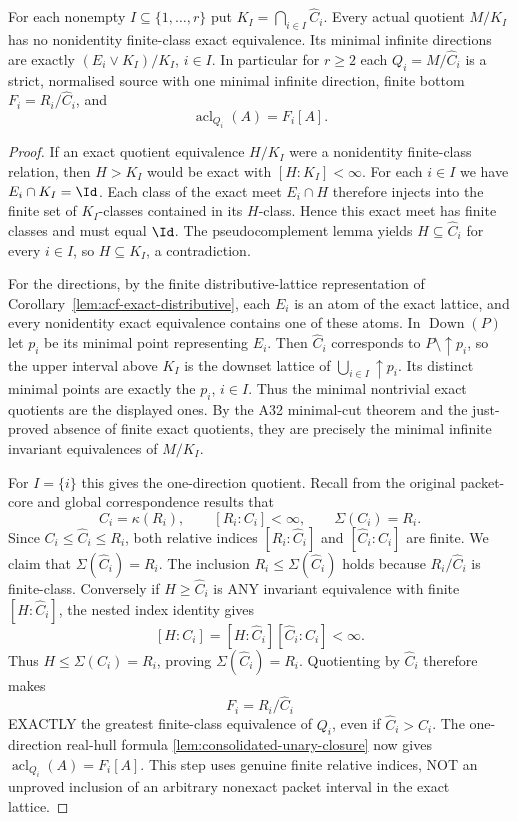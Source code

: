 \begin{lemma}
\label{lem:acf-hat-normalised}
For each nonempty $I\subseteq\{1,\ldots,r\}$ put
$K_I=\bigcap_{i\in I}\widehat C_i$.
Every actual quotient $M/K_I$ has no nonidentity finite-class
exact equivalence.  Its minimal infinite directions are exactly
$(E_i\vee K_I)/K_I$, $i\in I$.
In particular for $r\ge2$ each
$Q_i=M/\widehat C_i$ is a strict, normalised source with
one minimal infinite direction, finite bottom
$F_i=R_i/\widehat C_i$, and
\[
       \operatorname{acl}_{Q_i}(A)=F_i[A].
\]
\end{lemma}
\begin{proof}
If an exact quotient equivalence $H/K_I$ were a nonidentity
finite-class relation, then $H>K_I$ would be exact with
$[H:K_I]<\infty$.  For each $i\in I$ we have
$E_i\cap K_I=\Id$.  Each class of the exact meet
$E_i\cap H$ therefore injects into the finite set of
$K_I$-classes contained in its $H$-class.  Hence this exact
meet has finite classes and must equal $\Id$.
The pseudocomplement lemma yields
$H\subseteq\widehat C_i$ for every $i\in I$, so
$H\subseteq K_I$, a contradiction.

For the directions, by the finite distributive-lattice
representation of Corollary~\ref{lem:acf-exact-distributive},
each $E_i$ is an atom of the exact lattice, and every
nonidentity exact equivalence contains one of these atoms.
In $\operatorname{Down}(P)$ let $p_i$ be its minimal point
representing $E_i$.  Then $\widehat C_i$ corresponds to
$P\setminus\uparrow p_i$, so the upper interval above $K_I$
is the downset lattice of $\bigcup_{i\in I}\uparrow p_i$.
Its distinct minimal points are exactly the $p_i$, $i\in I$.
Thus the minimal nontrivial exact quotients are the displayed
ones.  By the A32 minimal-cut theorem and the just-proved
absence of finite exact quotients, they are precisely the
minimal infinite invariant equivalences of $M/K_I$.

For \(I=\{i\}\) this gives the
one-direction quotient.
Recall from the original packet-core and
global correspondence results that
\[
      C_i=\kappa(R_i),\qquad
      [R_i:C_i]<\infty,\qquad
      \Sigma(C_i)=R_i .
\]
Since
\(C_i\le\widehat C_i\le R_i\),
both relative indices
\([R_i:\widehat C_i]\) and
\([\widehat C_i:C_i]\)
are finite. We claim that
\(\Sigma(\widehat C_i)=R_i\).
The inclusion \(R_i\le\Sigma(\widehat C_i)\)
holds because \(R_i/\widehat C_i\)
is finite-class. Conversely if
\(H\ge\widehat C_i\) is ANY invariant
equivalence with finite
\([H:\widehat C_i]\), the nested
index identity gives
\[
 [H:C_i]=[H:\widehat C_i]
                 [\widehat C_i:C_i]
                     <\infty .
\]
Thus \(H\le\Sigma(C_i)=R_i\),
proving \(\Sigma(\widehat C_i)=R_i\).
Quotienting by \(\widehat C_i\)
therefore makes
\[
                  F_i=R_i/\widehat C_i
\]
EXACTLY the greatest finite-class
equivalence of \(Q_i\), even if
\(\widehat C_i>C_i\).
The one-direction real-hull formula
\cref{lem:consolidated-unary-closure}
now gives \(\operatorname{acl}_{Q_i}(A)
=F_i[A]\).
This step uses genuine finite relative
indices, NOT an unproved inclusion of
an arbitrary nonexact packet interval
in the exact lattice.
\end{proof}

